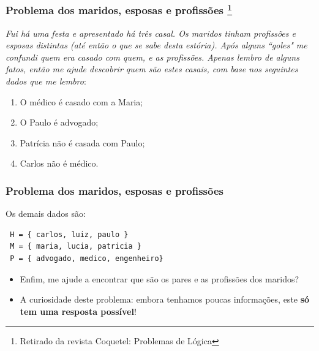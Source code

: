 \documentclass{beamer}
\begin{document}
\begin{frame}[fragile]
	\frametitle{Problema dos maridos, esposas e profissões \footnote{Retirado da revista Coquetel: Problemas de Lógica}}
	
\begin{block}{}
 \emph{Fui há uma festa e  apresentado há três casal.
 Os maridos tinham profissões  e esposas distintas (até então o que se sabe desta estória).
 Após alguns ``goles"\/ me confundi quem era casado com quem, e as profissões.
 Apenas lembro de alguns fatos, então me ajude descobrir quem
 são estes casais, com base nos seguintes dados que me lembro}:
\begin{enumerate}
 \item  O médico é casado com a Maria;
 \item  O Paulo é advogado;
 \item  Patrícia não é casada com Paulo;
  \item Carlos não é médico.
\end{enumerate}
 


\end{block}

\end{frame}


\begin{frame}[fragile]
   \frametitle{Problema dos maridos, esposas e profissões}
	
 Os demais dados são:
 \begin{verbatim}
 H = { carlos, luiz, paulo }
 M = { maria, lucia, patricia }
 P = { advogado, medico, engenheiro}
 \end{verbatim}

\pause
\begin{itemize}
\item Enfim, me ajude a encontrar que são os pares e as profissões dos maridos?

\item A curiosidade deste problema: embora tenhamos poucas informações, este \textbf{só tem uma resposta possível}!
\end{itemize}


\end{frame}





\end{document}
